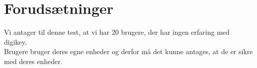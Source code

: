 \documentclass[12pt]{article}
\begin{document}

\clearpage\maketitle
\thispagestyle{empty}

\newpage


\thispagestyle{empty}

\pagestyle{plain}
\setcounter{page}{1}

\section*{Forudsætninger}
Vi antager til denne test, at vi har 20 brugere, der har ingen erfaring med digikey.\\
Brugere bruger deres egne enheder og derfor må det kunne antages, at de er sikre med deres enheder.
\end{document}

